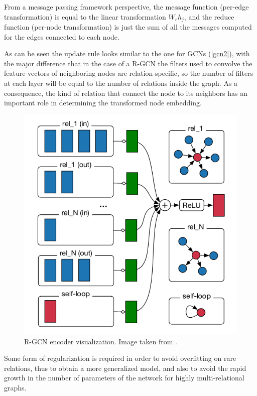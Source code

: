 \documentclass[%
    corpo=13.5pt,
    twoside,
    oldstyle,
    tipotesi=magistrale,
    greek,
    evenboxes
]{toptesi}
\begin{document}
From a message passing framework perspective, the message function (per-edge
transformation) is equal to the linear transformation $W_rh_j$, and the reduce
function (per-node transformation) is just the sum of
all the messages computed for the edges connected to each node.

As can be seen the update rule looks similar to the one for GCNs (\ref{gcn2}),
with the major difference that in the case of a R-GCN the filters used to
convolve the feature vectors of neighboring nodes are relation-specific, so the
number of filters at each layer will be equal to the number of relations inside
the graph. As a consequence, the kind of relation that connect the node
to its neighbors has an important role in determining the transformed node
embedding.

\begin{figure}[h]
    \centering
    \includegraphics[scale=0.48]{img/rgcn-encoder.png}
    \caption{R-GCN encoder visualization. Image taken from \cite{schlichtkrull2018}.}
    \label{fig:rgcn-encoder}
\end{figure}

Some form of regularization is required in order to avoid overfitting on rare
relations, thus to obtain a more generalized model, and also to avoid
the rapid growth in the number of parameters of the network for
highly multi-relational graphs.
\newpage
\end{document}
